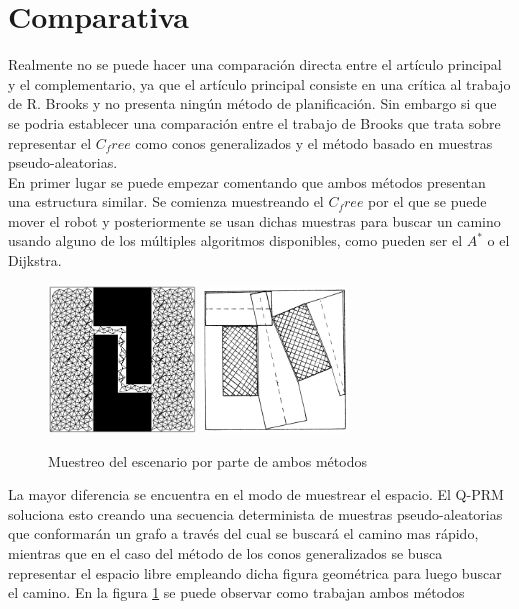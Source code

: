 \section{Comparativa}
\label{articulos_comparativa}

Realmente no se puede hacer una comparación directa entre el artículo principal y el complementario, ya que el artículo principal consiste en una crítica al trabajo de R. Brooks y no presenta ningún método de planificación. Sin embargo si que se podria establecer una comparación entre el trabajo de Brooks que trata sobre representar el $C_free$ como conos generalizados y el método basado en muestras pseudo-aleatorias.\\

En primer lugar se puede empezar comentando que ambos métodos presentan una estructura similar. Se comienza muestreando el $C_free$ por el que se puede mover el robot y posteriormente se usan dichas muestras para buscar un camino usando alguno de los múltiples algoritmos disponibles, como pueden ser el $A^*$ o el Dijkstra.\\

\begin{figure}[h]
		\centering
        \includegraphics[width=0.35\textwidth]{images/Q-PRM.png}
        \includegraphics[width=0.35\textwidth]{images/cones.png}
        \caption{Muestreo del escenario por parte de ambos métodos}
        \label{fig:muestreo_metodos}
\end{figure}  

La mayor diferencia se encuentra en el modo de muestrear el espacio. El Q-PRM soluciona esto creando una secuencia determinista de muestras pseudo-aleatorias que conformarán un grafo a través del cual se buscará el camino mas rápido, mientras que en el caso del método de los conos generalizados se busca representar el espacio libre empleando dicha figura geométrica para luego buscar el camino. En la figura \ref{fig:muestreo_metodos} se puede observar como trabajan ambos métodos\\


